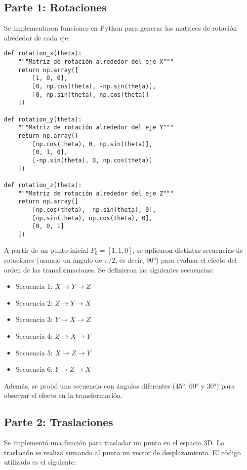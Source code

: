 \documentclass[a4paper,10pt]{article}
\begin{document}
\subsection{Parte 1: Rotaciones}
Se implementaron funciones en Python para generar las matrices de rotación alrededor de cada eje:
\begin{lstlisting}[caption={Funciones para crear matrices de rotación}, label=lst:rotaciones]
def rotation_x(theta):
    """Matriz de rotación alrededor del eje X"""
    return np.array([
        [1, 0, 0],
        [0, np.cos(theta), -np.sin(theta)],
        [0, np.sin(theta), np.cos(theta)]
    ])

def rotation_y(theta):
    """Matriz de rotación alrededor del eje Y"""
    return np.array([
        [np.cos(theta), 0, np.sin(theta)],
        [0, 1, 0],
        [-np.sin(theta), 0, np.cos(theta)]
    ])

def rotation_z(theta):
    """Matriz de rotación alrededor del eje Z"""
    return np.array([
        [np.cos(theta), -np.sin(theta), 0],
        [np.sin(theta), np.cos(theta), 0],
        [0, 0, 1]
    ])
\end{lstlisting}

A partir de un punto inicial $P_0 = [1,1,0]$, se aplicaron distintas secuencias de rotaciones (usando un ángulo de $\pi/2$, es decir, 90°) para evaluar el efecto del orden de las transformaciones. Se definieron las siguientes secuencias:
\begin{itemize}
    \item Secuencia 1: $X \rightarrow Y \rightarrow Z$
    \item Secuencia 2: $Z \rightarrow Y \rightarrow X$
    \item Secuencia 3: $Y \rightarrow X \rightarrow Z$
    \item Secuencia 4: $Z \rightarrow X \rightarrow Y$
    \item Secuencia 5: $X \rightarrow Z \rightarrow Y$
    \item Secuencia 6: $Y \rightarrow Z \rightarrow X$
\end{itemize}

Además, se probó una secuencia con ángulos diferentes (45°, 60° y 30°) para observar el efecto en la transformación.

\subsection{Parte 2: Traslaciones}
Se implementó una función para trasladar un punto en el espacio 3D. La traslación se realiza sumando al punto un vector de desplazamiento. El código utilizado es el siguiente:
\end{document}
